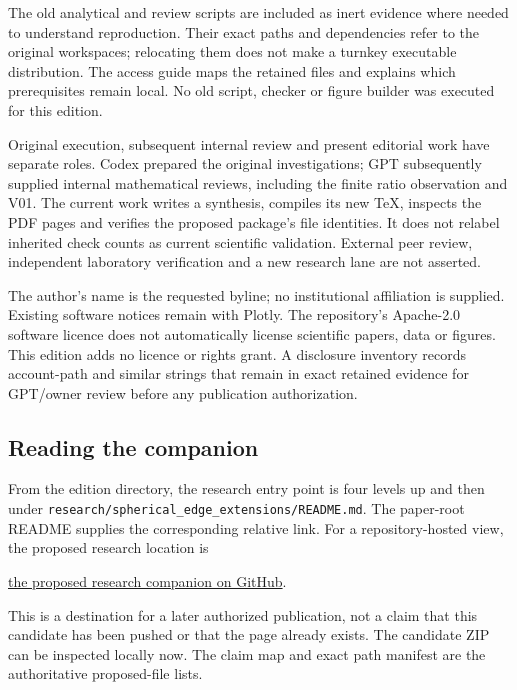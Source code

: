 \documentclass[11pt,a4paper]{article}
\begin{document}
The old analytical and review scripts are included as inert evidence where needed to understand reproduction. Their exact paths and dependencies refer to the original workspaces; relocating them does not make a turnkey executable distribution. The access guide maps the retained files and explains which prerequisites remain local. No old script, checker or figure builder was executed for this edition.

Original execution, subsequent internal review and present editorial work have separate roles. Codex prepared the original investigations; GPT subsequently supplied internal mathematical reviews, including the finite ratio observation and V01. The current work writes a synthesis, compiles its new TeX, inspects the PDF pages and verifies the proposed package's file identities. It does not relabel inherited check counts as current scientific validation. External peer review, independent laboratory verification and a new research lane are not asserted.

The author's name is the requested byline; no institutional affiliation is supplied. Existing software notices remain with Plotly. The repository's Apache-2.0 software licence does not automatically license scientific papers, data or figures. This edition adds no licence or rights grant. A disclosure inventory records account-path and similar strings that remain in exact retained evidence for GPT/owner review before any publication authorization.

\subsection*{Reading the companion}
From the edition directory, the research entry point is four levels up and then under \texttt{research/spherical\_edge\_extensions/README.md}. The paper-root README supplies the corresponding relative link. For a repository-hosted view, the proposed research location is
\begin{flushleft}\small
\href{https://github.com/pzychozen/trioctagon-physics/tree/main/research/spherical_edge_extensions}{the proposed research companion on GitHub}.
\end{flushleft}
This is a destination for a later authorized publication, not a claim that this candidate has been pushed or that the page already exists. The candidate ZIP can be inspected locally now. The claim map and exact path manifest are the authoritative proposed-file lists.
\end{document}
